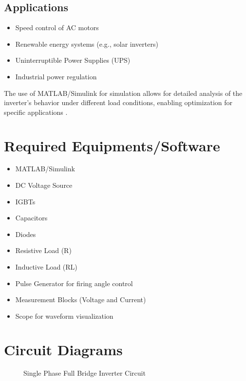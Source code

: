 \documentclass[12pt]{article}
\begin{document}
\subsection*{Applications}
\begin{itemize}
    \item Speed control of AC motors
    \item Renewable energy systems (e.g., solar inverters)
    \item Uninterruptible Power Supplies (UPS)
    \item Industrial power regulation
\end{itemize}

The use of MATLAB/Simulink for simulation allows for detailed analysis of the inverter's behavior under different load conditions, enabling optimization for specific applications \cite{mathworks2023simulink}.


\section*{Required Equipments/Software}
\begin{itemize}
    \item MATLAB/Simulink
    \item DC Voltage Source
    \item IGBTs
    \item Capacitors
    \item Diodes
    \item Resistive Load (R)
    \item Inductive Load (RL)
    \item Pulse Generator for firing angle control
    \item Measurement Blocks (Voltage and Current)
    \item Scope for waveform visualization
\end{itemize}

\section*{Circuit Diagrams}
\begin{figure}[H]
    \centering
    \caption{Single Phase Full Bridge Inverter Circuit}
\end{figure}
\end{document}
